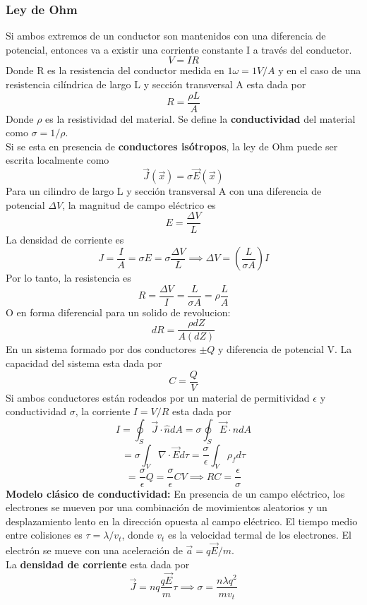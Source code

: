 \documentclass[a4paper, 10pt]{article}
\begin{document}
\begin{multicols*}{2}
	\subsubsection{Ley de Ohm}
	Si ambos extremos de un conductor son mantenidos con una diferencia de potencial, entonces va a existir una corriente constante I a través del conductor.
	$$V = IR$$
	Donde R es la resistencia del conductor medida en $1 \omega = 1 V/A$ y en el caso de una resistencia cilíndrica de largo L y sección transversal A esta dada por 
	$$R=\frac{\rho L}{A}$$
	Donde $\rho$ es la resistividad del material.
	Se define la \textbf{conductividad }del material como $\sigma=1/\rho$.\\
	Si se esta en presencia de \textbf{conductores isótropos}, la ley de Ohm puede ser escrita localmente como 
  $$\vec{J}(\vec{x})=\sigma\vec{E}(\vec{x})$$
	Para un cilindro de largo L y sección transversal A con una diferencia de potencial $\Delta V$, la magnitud de campo eléctrico es
	$$E=\frac{\Delta V}{L}$$
	La densidad de corriente es
	$$J= \frac{I}{A}=\sigma E=\sigma \frac{\Delta V}{L }\implies \Delta V = (\frac{L}{\sigma A})I$$
	Por lo tanto, la resistencia es
	$$R=\frac{\Delta V}{I}=\frac{L}{\sigma A}=\rho \frac{L}{A}$$
  O en forma diferencial para un solido de revolucion:
  \begin{equation}
    dR = \frac{\rho dZ}{A(dZ)} 
  \end{equation}
	En un sistema formado por dos conductores $\pm Q$ y diferencia de potencial V. La capacidad del sistema esta dada por 
	$$C=\frac{Q}{V}$$
	Si ambos conductores están rodeados por un material de permitividad $\epsilon$ y conductividad $\sigma$, la corriente $I=V/R$ esta dada por
	$$I = \oint_S \vec{J} \cdot \hat{n} dA = \sigma \oint_S \vec{E} \cdot \hat{n} dA$$
	$$= \sigma \int_V \nabla \cdot \vec{E} d \tau = \frac{\sigma}{\epsilon} \int_V \rho_f d\tau$$
	$$= \frac{\sigma}{\epsilon}Q=\frac{\sigma}{\epsilon} CV \implies RC=\frac{\epsilon}{\sigma}$$
	\textbf{Modelo clásico de conductividad: }En presencia de un campo eléctrico, los electrones se mueven por una combinación de movimientos aleatorios y un desplazamiento lento en la dirección opuesta al campo eléctrico.
	El tiempo medio entre colisiones es $\tau =\lambda / v_t$, donde $v_t $ es la velocidad termal de los electrones. El electrón se mueve con una aceleración de $\vec{a}=q\vec{E}/m$.\\
	La \textbf{densidad de corriente} esta dada por
	$$\vec{J} = nq \frac{q \vec{E}}{m}\tau \implies \sigma = \frac{n \lambda q^2}{m v_t}$$
	    

\end{multicols*}
\end{document}
